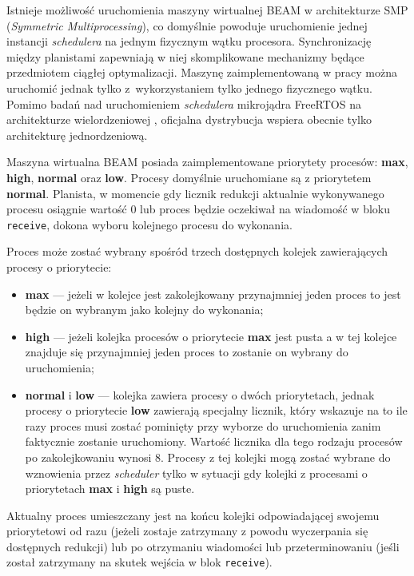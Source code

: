 Istnieje możliwość uruchomienia maszyny wirtualnej BEAM w architekturze SMP (\emph{Symmetric Multiprocessing}), co domyślnie powoduje uruchomienie jednej instancji \emph{schedulera} na jednym fizycznym wątku procesora.
Synchronizację między planistami zapewniają w niej skomplikowane mechanizmy będące przedmiotem ciągłej optymalizacji.
Maszynę zaimplementowaną w pracy można uruchomić jednak tylko z~wykorzystaniem tylko jednego fizycznego wątku.
Pomimo badań nad uruchomieniem \emph{schedulera} mikrojądra FreeRTOS na architekturze wielordzeniowej \cite{Mistry2011}, oficjalna dystrybucja wspiera obecnie tylko architekturę jednordzeniową.

Maszyna wirtualna BEAM posiada zaimplementowane priorytety procesów: \textbf{max}, \textbf{high}, \textbf{normal} oraz \textbf{low}.
Procesy domyślnie uruchomiane są z priorytetem \textbf{normal}. 
Planista, w momencie gdy licznik redukcji aktualnie wykonywanego procesu osiągnie wartość 0 lub proces będzie oczekiwał na wiadomość w bloku \texttt{receive}, dokona wyboru kolejnego procesu do wykonania.

Proces może zostać wybrany spośród trzech dostępnych kolejek zawierających procesy o priorytecie:
\begin{itemize}
\item \textbf{max} --- jeżeli w kolejce jest zakolejkowany przynajmniej jeden proces to jest będzie on wybranym jako kolejny do wykonania;
\item \textbf{high} --- jeżeli kolejka procesów o priorytecie \textbf{max} jest pusta a w tej kolejce znajduje się przynajmniej jeden proces to zostanie on wybrany do uruchomienia;
\item \textbf{normal} i \textbf{low} --- kolejka zawiera procesy o dwóch priorytetach, jednak procesy o priorytecie \textbf{low} zawierają specjalny licznik, który wskazuje na to ile razy proces musi zostać pominięty przy wyborze do uruchomienia zanim faktycznie zostanie uruchomiony. Wartość licznika dla tego rodzaju procesów po zakolejkowaniu wynosi 8. Procesy z tej kolejki mogą zostać wybrane do wznowienia przez \emph{scheduler} tylko w sytuacji gdy kolejki z procesami o priorytetach \textbf{max} i \textbf{high} są puste.
\end{itemize}

Aktualny proces umieszczany jest na końcu kolejki odpowiadającej swojemu priorytetowi od razu (jeżeli zostaje zatrzymany z powodu wyczerpania się dostępnych redukcji) lub po otrzymaniu wiadomości lub przeterminowaniu (jeśli został zatrzymany na skutek wejścia w blok \texttt{receive}).

